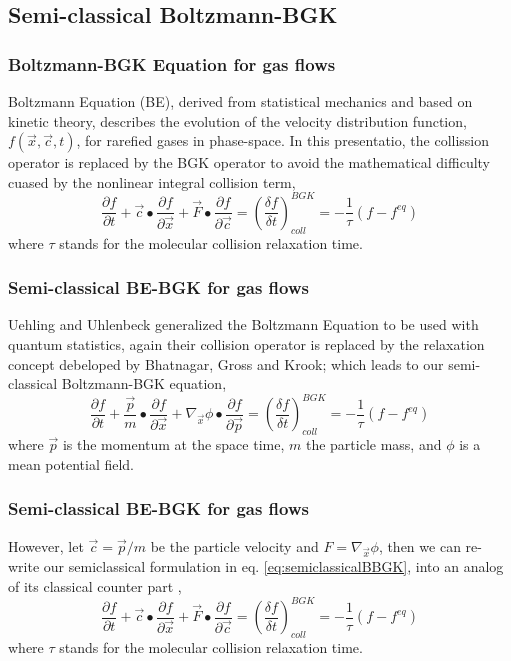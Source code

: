 \subsection{Semi-classical Boltzmann-BGK}

\begin{frame}
	\frametitle{Boltzmann-BGK Equation for gas flows}
	Boltzmann Equation (BE), derived from statistical mechanics and based on kinetic theory, describes the evolution of the velocity distribution function, $f(\vec{x},\vec{c},t)$, for rarefied gases in phase-space. In this presentatio, the collission operator is replaced by the BGK operator to avoid the mathematical difficulty cuased by the nonlinear integral collision term,
	\begin{equation}
	\frac{\partial{f}}{\partial{t}} +
	\vec{c}\bullet\frac{\partial{f}}{\partial{\vec{x}}} +
	\vec{F}\bullet\frac{\partial{f}}{\partial{\vec{c}}} = 
	\left( \frac{\delta f}{\delta t}\right )^{BGK}_{coll} = -\frac{1}{\tau}(f-f^{eq})
	\label{eq:classicalBBGK}
	\end{equation}
	where $\tau$ stands for the molecular collision relaxation time.
\end{frame}

\begin{frame}
	\frametitle{Semi-classical BE-BGK for gas flows}
	Uehling and Uhlenbeck \cite{PhysRev.43.552} generalized the Boltzmann Equation to be used with quantum statistics, again their collision operator is replaced by the relaxation concept debeloped by Bhatnagar, Gross and Krook; which leads to our semi-classical Boltzmann-BGK equation,
	\begin{equation}
	\frac{\partial{f}}{\partial{t}} +
	\frac{\vec{p}}{m}\bullet\frac{\partial{f}}{\partial{\vec{x}}} +
	\nabla_\vec{x}{\phi}\bullet\frac{\partial{f}}{\partial{\vec{p}}} = 
	\left( \frac{\delta f}{\delta t}\right )^{BGK}_{coll} = -\frac{1}{\tau}(f-f^{eq})
	\label{eq:semiclassicalBBGK}
	\end{equation}
	where $\vec{p}$ is the momentum at the space time, $m$ the particle mass, and $\phi$ is a mean potential field.
\end{frame}

\begin{frame}
	\frametitle{Semi-classical BE-BGK for gas flows}
	However, let $\vec{c} = \vec{p} / m$ be the particle velocity and $F = \nabla_\vec{x}{\phi}$, then we can re-write our semiclassical formulation in eq. \ref{eq:semiclassicalBBGK}, into an analog of its classical counter part \cite{Yang2013},
	\begin{equation}
	\frac{\partial{f}}{\partial{t}} +
	\vec{c}\bullet\frac{\partial{f}}{\partial{\vec{x}}} +
	\vec{F}\bullet\frac{\partial{f}}{\partial{\vec{c}}} = 
	\left( \frac{\delta f}{\delta t}\right )^{BGK}_{coll} = -\frac{1}{\tau}(f-f^{eq})
	\end{equation}
	where $\tau$ stands for the molecular collision relaxation time.
\end{frame}

